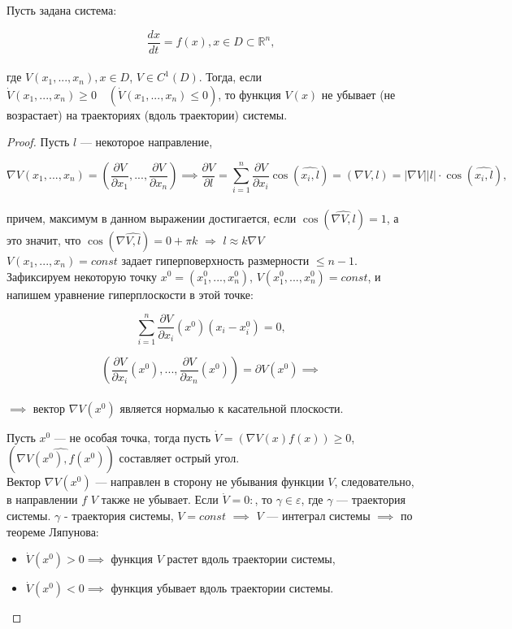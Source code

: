 \begin{lemma}
Пусть задана система:

$$
	\frac{dx}{dt}=f(x),x\in D \subset {\mathbb R}^n,
$$\\
где $V(x_1,...,x_n), x \in D$, $V \in C^1(D)$. Тогда, если $\dot{V}(x_1,...,x_n) \geq 0 \quad (\dot{V}(x_1,...,x_n) \leq 0)$, то функция $V(x)$ не убывает (не возрастает) на траекториях (вдоль траектории) системы.\\
\begin{proof}
Пусть $l$ --- некоторое направление,

$$
	\nabla V(x_1,...,x_n)=\left(\frac{\partial V}{\partial x_1},...,\frac{\partial V}{\partial x_n}\right) \implies \frac{\partial V}{\partial l}=\sum_{i=1}^n{\frac{\partial V}{\partial x_i} \cos(\widehat{x_i, l})}=(\nabla V,l)=|\nabla V||l|\cdot{}\cos(\widehat{x_i, l}),
$$\\
причем, максимум в данном выражении достигается, если $\cos(\widehat{\nabla V,l})=1$, а это значит, что $\cos(\nabla \widehat{V,l})=0+\pi k$ $\Rightarrow$ $l \approx k \nabla V$ \\
$V(x_1,...,x_n)=const$ задает гиперповерхность размерности $\leq n-1$. Зафиксируем некоторую точку $x^0=(x_1^0,...,x_n^0)$, $V(x_1^0,...,x_n^0)=const$, и напишем уравнение гиперплоскости в этой точке:

$$
\sum_{i=1}^n{\frac{\partial V}{\partial x_i}(x^0)(x_i-x_i^0)}=0,
$$

$$
\left(\frac{\partial V}{\partial x_i}(x^0),...,\frac{\partial V}{\partial x_n}(x^0)\right)=\partial V(x^0) \implies
$$\\
$\implies$ вектор $\nabla V(x^0)$ является нормалью к касательной плоскости.


Пусть $x^0$ --- не особая точка, тогда пусть $\dot{V}=(\nabla V(x)f(x))\geq 0$, $(\widehat{\nabla V(x^0),f(x^0)})$ составляет острый угол.\\
Вектор $\nabla V(x^0)$ --- направлен в сторону не убывания функции $V$, следовательно, в направлении $f$ $V$ также не убывает. Если $\dot{V} = 0:$, то $\gamma \in \varepsilon$, где $\gamma$ --- траектория системы.
$\gamma$ - траектория системы, $V=const$ $\implies$ $V$ --- интеграл системы $\implies$ по теореме Ляпунова:
\begin{itemize} 
	\item $\dot{V}(x^0)>0 \implies$ функция $V$ растет вдоль траектории системы,\\
	\item $\dot{V}(x^0)<0 \implies$ функция убывает вдоль траектории системы.
\end{itemize}
\end{proof}
\end{lemma}

